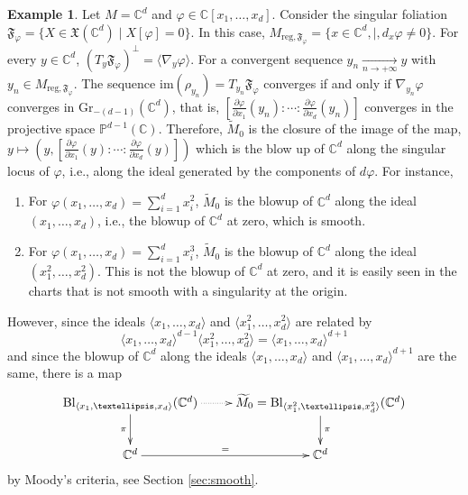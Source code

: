 \documentclass[10pt]{article}
\theoremstyle{plain}
\theoremstyle{definition}
\newtheorem{example}[lemma]{Example}
\theoremstyle{remark}
\begin{document}
\begin{example}\label{ex:along-phi}
     Let $M=\mathbb C^d$ and $\varphi\in\mathbb{C}[x_1,\ldots,x_d]$. Consider the singular foliation $\mathfrak{F}_\varphi=\{X\in \mathfrak{X}(\mathbb{C}^d)\mid X[\varphi]=0\}$. In this case, $M_{\mathrm{reg},\mathfrak F_\varphi}=\{x\in \mathbb C^d, \mid, d_x\varphi\neq 0\}$. 
    For every $y\in \mathbb C^d$, $(T_y\mathfrak{F}_\varphi)^\bot= \langle \nabla_y\varphi\rangle$. For a convergent sequence $y_n\underset{n \to +\infty}{\longrightarrow}y$ with $y_n\in M_{\mathrm{reg}, \mathfrak {F}_\varphi}$. The sequence $\mathrm{im}(\rho_{y_n})=T_{y_n}\mathfrak F_\varphi$ converges if and only if $\nabla_{y_n}\varphi$ converges in $\mathrm{Gr}_{-(d-1)}(\mathbb{C}^d)$, that is, $\left[\frac{\partial \varphi}{\partial x_1}(y_n)\colon \cdots \colon\frac{\partial \varphi}{\partial x_d}(y_n)\right]$ converges in the projective space $\mathbb{P}^{d-1}(\mathbb{C})$. Therefore, $\widetilde M_0$ is the closure of the image of the map, $y\mapsto (y, \left[\frac{\partial \varphi}{\partial x_1}(y)\colon \cdots \colon\frac{\partial \varphi}{\partial x_d}(y)\right])$ which is the  blow up of $\mathbb{C}^d$ along the singular locus of $\varphi$, i.e., along the ideal generated by the components of  $d\varphi$. For instance, 

    \begin{enumerate}
        \item For $\varphi(x_1,\ldots, x_d)= \sum_{i=1}^dx_i^2$, $\widetilde M_0$ is the blowup of $\mathbb C^d$ along the ideal $(x_1,\ldots, x_d)$, i.e., the blowup of $\mathbb C^d$ at zero, which is smooth.

        \item For $\varphi(x_1,\ldots, x_d)= \sum_{i=1}^dx_i^3$, $\widetilde M_0$ is the blowup of $\mathbb C^d$ along the ideal $(x_1^2,\ldots, x_d^2)$. This is not the blowup of $\mathbb C^d$ at zero, and it is easily seen in the charts that is not smooth with a singularity at the origin.
    \end{enumerate}
    However, since the ideals $\langle x_1,\ldots,x_d\rangle$ and $\langle x_1^2,\ldots,x_d^2\rangle$ are related by $$\langle x_1,\ldots,x_d\rangle^{d-1} \langle x_1^2,\ldots,x_d^2\rangle=\langle x_1,\ldots,x_d\rangle^{d+1}$$ and since the blowup of $\mathbb C^d$ along the ideals $\langle x_1,\ldots,x_d\rangle$ and $\langle x_1,\ldots,x_d\rangle^{d+1}$ are the same, there is a map \begin{equation*}  \xymatrix{\mathrm{Bl}_{\langle x_1,\ldots,x_d\rangle}(\mathbb C^d) \ar@{.>}[r]\ar[d]_\pi&\ar[d]^\pi \widetilde M_0=\mathrm{Bl}_{\langle x_1^2,\ldots,x_d^2\rangle}(\mathbb C^d)\\ \mathbb C^d \ar[r]^{=}& \mathbb C^d}  \end{equation*}by Moody's criteria, see Section \ref{sec:smooth}.
     \end{example}
 
\end{document}
